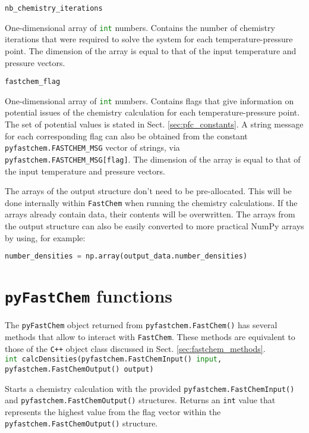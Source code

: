 \documentclass[numbers=noenddot]{aux/fcmanual}
\newcommand{\fc}{\texttt{FastChem}\xspace}
\newcommand{\pfc}{\texttt{pyFastChem}\xspace}
\newcommand{\cpp}{\ttt{C++}\xspace}
\newcommand{\ttt}[1]{\texttt {#1}}
\begin{document}
\bigbreak

\lstinline!nb_chemistry_iterations!
\begin{addmargin}[25pt]{0pt}
	One-dimensional array of \lstinline[language=Python]!int! numbers. Contains the number of chemistry iterations that were required to solve the system for each temperature-pressure point. The dimension of the array is equal to that of the input temperature and pressure vectors.
\end{addmargin}

\bigbreak

\lstinline!fastchem_flag!
\begin{addmargin}[25pt]{0pt}
	One-dimensional array of \lstinline[language=Python]!int! numbers. Contains flags that give information on potential issues of the chemistry calculation for each temperature-pressure point. The set of potential values is stated in Sect. \ref{sec:pfc_constants}. A string message for each corresponding flag can also be obtained from the constant \lstinline!pyfastchem.FASTCHEM_MSG! vector of strings, via \lstinline!pyfastchem.FASTCHEM_MSG[flag]!. The dimension of the array is equal to that of the input temperature and pressure vectors.
\end{addmargin}

\bigbreak

The arrays of the output structure don't need to be pre-allocated. This will be done internally within \fc when running the chemistry calculations. If the arrays already contain data, their contents will be overwritten. The arrays from the output structure can also be easily converted to more practical NumPy arrays by using, for example:
\begin{lstlisting}[language=Python]
  number_densities = np.array(output_data.number_densities)
\end{lstlisting} 


\section{\pfc functions}
\label{sec:pfc_methods}

The \pfc object returned from \lstinline[language=Python]!pyfastchem.FastChem()! has several methods that allow to interact with \fc. These methods are equivalent to those of the \cpp object class discussed in Sect. \ref{sec:fastchem_methods}.\\

\lstinline[language=Python]!int calcDensities(pyfastchem.FastChemInput() input, pyfastchem.FastChemOutput() output)!
\begin{addmargin}[25pt]{0pt}
	Starts a chemistry calculation with the provided \lstinline!pyfastchem.FastChemInput()! and \lstinline!pyfastchem.FastChemOutput()! structures. Returns an \lstinline!int! value that represents the highest value from the flag vector within the \lstinline!pyfastchem.FastChemOutput()! structure.
\end{addmargin}
\end{document}
